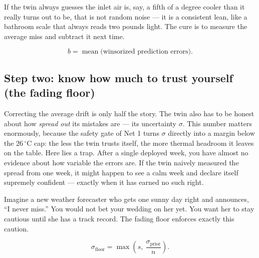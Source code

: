 If the twin always guesses the inlet air is, say, a fifth of a degree cooler than it really turns out to be, that is not random noise --- it is a consistent lean, like a bathroom scale that always reads two pounds light. The cure is to measure the average miss and subtract it next time.

\begin{equation}\label{eq:bias}
b = \operatorname{mean}\big(\text{winsorized prediction errors}\big).
\end{equation}

\subsection{Step two: know how much to trust yourself (the fading floor)}

Correcting the average drift is only half the story. The twin also has to be honest about how \emph{spread out} its mistakes are --- its uncertainty $\sigma$. This number matters enormously, because the safety gate of Net 1 turns $\sigma$ directly into a margin below the $26\,^\circ$C cap: the less the twin trusts itself, the more thermal headroom it leaves on the table. Here lies a trap. After a single deployed week, you have almost no evidence about how variable the errors are. If the twin naively measured the spread from one week, it might happen to see a calm week and declare itself supremely confident --- exactly when it has earned no such right.

\begin{analogy}
Imagine a new weather forecaster who gets one sunny day right and announces, ``I never miss.'' You would not bet your wedding on her yet. You want her to stay cautious until she has a track record. The fading floor enforces exactly this caution.
\end{analogy}

\begin{equation}\label{eq:fadingfloor}
\sigma_{\text{floor}} = \max\!\left(s,\ \frac{\sigma_{\text{prior}}}{n}\right).
\end{equation}

